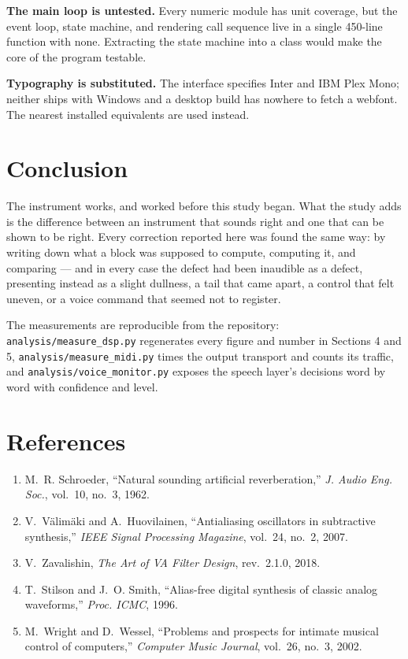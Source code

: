 \documentclass[a4paper,11pt]{article}
\newcommand{\code}[1]{\texttt{\small #1}}
\begin{document}
\textbf{The main loop is untested.} Every numeric module has unit coverage, but
the event loop, state machine, and rendering call sequence live in a single
450-line function with none. Extracting the state machine into a class would
make the core of the program testable.

\textbf{Typography is substituted.} The interface specifies Inter and IBM Plex
Mono; neither ships with Windows and a desktop build has nowhere to fetch a
webfont. The nearest installed equivalents are used instead.

\section{Conclusion}

The instrument works, and worked before this study began. What the study adds
is the difference between an instrument that sounds right and one that can be
shown to be right. Every correction reported here was found the same way: by
writing down what a block was supposed to compute, computing it, and comparing
--- and in every case the defect had been inaudible as a defect, presenting
instead as a slight dullness, a tail that came apart, a control that felt
uneven, or a voice command that seemed not to register.

The measurements are reproducible from the repository:
\code{analysis/measure\_dsp.py} regenerates every figure and number in
Sections 4 and 5, \code{analysis/measure\_midi.py} times the output transport
and counts its traffic, and \code{analysis/voice\_monitor.py} exposes the
speech layer's decisions word by word with confidence and level.

\section*{References}
\small
\begin{enumerate}\itemsep1pt
\item M.~R. Schroeder, ``Natural sounding artificial reverberation,''
      \emph{J. Audio Eng. Soc.}, vol.~10, no.~3, 1962.
\item V.~V\"alim\"aki and A.~Huovilainen, ``Antialiasing oscillators in
      subtractive synthesis,'' \emph{IEEE Signal Processing Magazine},
      vol.~24, no.~2, 2007.
\item V.~Zavalishin, \emph{The Art of VA Filter Design}, rev.~2.1.0, 2018.
\item T.~Stilson and J.~O. Smith, ``Alias-free digital synthesis of classic
      analog waveforms,'' \emph{Proc. ICMC}, 1996.
\item M.~Wright and D.~Wessel, ``Problems and prospects for intimate musical
      control of computers,'' \emph{Computer Music Journal}, vol.~26, no.~3,
      2002.
\end{enumerate}
\end{document}
